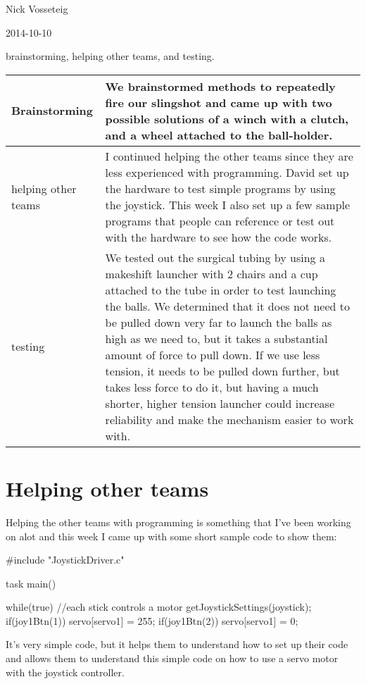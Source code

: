 \usepackage{listings}

Nick Vosseteig

2014-10-10

brainstorming, helping other teams, and testing.

\begin{tabular}{|p{5cm}|p{5cm}|}
 \hline
 Brainstorming&
We brainstormed methods to repeatedly fire our slingshot and came up with two possible solutions of a winch with a clutch, and a wheel attached to the ball-holder.
 \\
 \hline
helping other teams&
I continued helping the other teams since they are less experienced with programming. David set up the hardware to test simple programs by using the joystick. This week I also set up a few sample programs that people can reference or test out with the hardware to see how the code works. 
 \\
 \hline
 testing&
We tested out the surgical tubing by using a makeshift launcher with 2 chairs and a cup attached to the tube in order to test launching the balls. We determined that it does not need to be pulled down very far to launch the balls as high as we need to, but it takes a substantial amount of force to pull down. If we use less tension, it needs to be pulled down further, but takes less force to do it, but having a much shorter, higher tension launcher could increase reliability and make the mechanism easier to work with.
 \\
 \hline
\end{tabular}

\section*{Helping other teams}
Helping the other teams with programming is something that I've been working on alot and this week I came up with some short sample code to show them:
\begin{listing}	
	#include "JoystickDriver.c"

	task main()
	{

		while(true)
		{
			//each stick controls a motor
			getJoystickSettings(joystick);
			if(joy1Btn(1)){
				servo[servo1] = 255;
			}
			if(joy1Btn(2)){
				servo[servo1] = 0;
			}
		}
	}
\end{listing}
It's very simple code, but it helps them to understand how to set up their code and allows them to understand this simple code on how to use a servo motor with the joystick controller.

